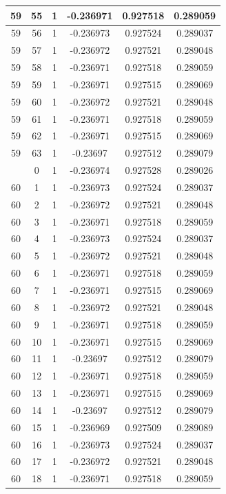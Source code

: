 \documentclass[12pt,a4paper]{article}
\numberwithin{equation}{section}
\numberwithin{figure}{section}
\numberwithin{table}{section}
\begin{document}
\begin{longtable}{|c|c|c|c|c|c|}
59 & 55 & 1 & -0.236971 & 0.927518 & 0.289059 \\ \hline
59 & 56 & 1 & -0.236973 & 0.927524 & 0.289037 \\ \hline
59 & 57 & 1 & -0.236972 & 0.927521 & 0.289048 \\ \hline
59 & 58 & 1 & -0.236971 & 0.927518 & 0.289059 \\ \hline
59 & 59 & 1 & -0.236971 & 0.927515 & 0.289069 \\ \hline
59 & 60 & 1 & -0.236972 & 0.927521 & 0.289048 \\ \hline
59 & 61 & 1 & -0.236971 & 0.927518 & 0.289059 \\ \hline
59 & 62 & 1 & -0.236971 & 0.927515 & 0.289069 \\ \hline
59 & 63 & 1 & -0.23697 & 0.927512 & 0.289079 \\ \hline
\pagebreak
60 & 0 & 1 & -0.236974 & 0.927528 & 0.289026 \\ \hline
60 & 1 & 1 & -0.236973 & 0.927524 & 0.289037 \\ \hline
60 & 2 & 1 & -0.236972 & 0.927521 & 0.289048 \\ \hline
60 & 3 & 1 & -0.236971 & 0.927518 & 0.289059 \\ \hline
60 & 4 & 1 & -0.236973 & 0.927524 & 0.289037 \\ \hline
60 & 5 & 1 & -0.236972 & 0.927521 & 0.289048 \\ \hline
60 & 6 & 1 & -0.236971 & 0.927518 & 0.289059 \\ \hline
60 & 7 & 1 & -0.236971 & 0.927515 & 0.289069 \\ \hline
60 & 8 & 1 & -0.236972 & 0.927521 & 0.289048 \\ \hline
60 & 9 & 1 & -0.236971 & 0.927518 & 0.289059 \\ \hline
60 & 10 & 1 & -0.236971 & 0.927515 & 0.289069 \\ \hline
60 & 11 & 1 & -0.23697 & 0.927512 & 0.289079 \\ \hline
60 & 12 & 1 & -0.236971 & 0.927518 & 0.289059 \\ \hline
60 & 13 & 1 & -0.236971 & 0.927515 & 0.289069 \\ \hline
60 & 14 & 1 & -0.23697 & 0.927512 & 0.289079 \\ \hline
60 & 15 & 1 & -0.236969 & 0.927509 & 0.289089 \\ \hline
60 & 16 & 1 & -0.236973 & 0.927524 & 0.289037 \\ \hline
60 & 17 & 1 & -0.236972 & 0.927521 & 0.289048 \\ \hline
60 & 18 & 1 & -0.236971 & 0.927518 & 0.289059 \\ \hline

\end{longtable}
\end{document}
